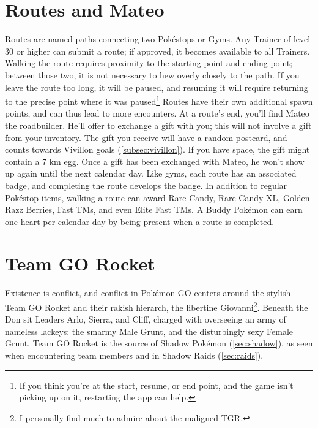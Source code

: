 \section{Routes and Mateo\label{sec:routes}}
Routes are named paths connecting two Pokéstops or Gyms.
Any Trainer of level 30 or higher can submit a route; if approved, it becomes available to all Trainers.
Walking the route requires proximity to the starting point and ending point; between those two,
 it is not necessary to hew overly closely to the path.
If you leave the route too long, it will be paused, and resuming it will require returning to the precise
 point where it was paused\footnote{If you think you're at the start, resume, or end point, and the game isn't picking
 up on it, restarting the app can help.}
Routes have their own additional spawn points, and can thus lead to more encounters.
At a route's end, you'll find Mateo the roadbuilder.
He'll offer to exchange a gift with you; this will not involve a gift from your inventory.
The gift you receive will have a random postcard, and counts towards Vivillon goals (\autoref{subsec:vivillon}).
If you have space, the gift might contain a 7 km egg.
Once a gift has been exchanged with Mateo, he won't show up again until the next calendar day.
Like gyms, each route has an associated badge, and completing the route develops the badge.
In addition to regular Pokéstop items, walking a route can award Rare Candy, Rare Candy XL,
 Golden Razz Berries, Fast TMs, and even Elite Fast TMs.
A Buddy Pokémon can earn one heart per calendar day by being present when a route is completed.

\section{Team GO Rocket\label{sec:gorocket}}
Existence is conflict, and conflict in Pokémon GO centers around the stylish Team GO Rocket
 and their rakish hierarch, the libertine Giovanni\footnote{I personally find much to admire about the maligned TGR.}.
Beneath the Don sit Leaders Arlo, Sierra, and Cliff, charged with overseeing an army
 of nameless lackeys: the smarmy Male Grunt, and the disturbingly sexy Female Grunt.
Team GO Rocket is the source of Shadow Pokémon (\autoref{sec:shadow}),
 as seen when encountering team members and in Shadow Raids (\autoref{sec:raids}).

